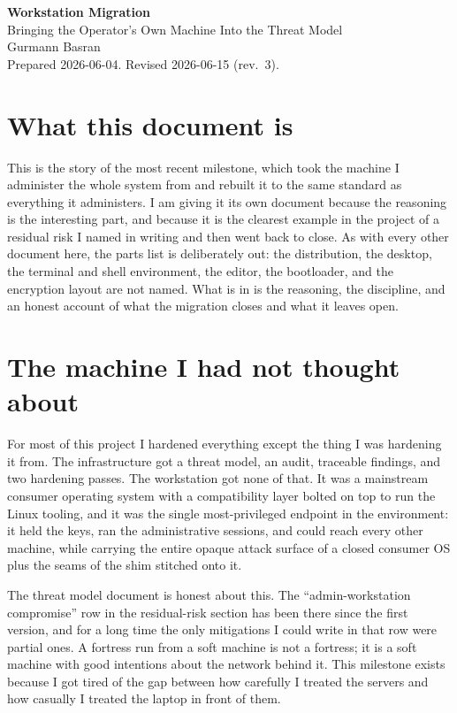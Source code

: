 \documentclass[12pt]{article}
\begin{document}
\begin{center}
{\LARGE\textbf{Workstation Migration}}\\[4pt]
{\large Bringing the Operator's Own Machine Into the Threat Model}\\[6pt]
Gurmann Basran\\
\small Prepared 2026-06-04. Revised 2026-06-15 (rev.\ 3).
\end{center}

\section{What this document is}

This is the story of the most recent milestone, which took the machine I administer the whole system from and rebuilt it to the same standard as everything it administers. I am giving it its own document because the reasoning is the interesting part, and because it is the clearest example in the project of a residual risk I named in writing and then went back to close. As with every other document here, the parts list is deliberately out: the distribution, the desktop, the terminal and shell environment, the editor, the bootloader, and the encryption layout are not named. What is in is the reasoning, the discipline, and an honest account of what the migration closes and what it leaves open.

\section{The machine I had not thought about}

For most of this project I hardened everything except the thing I was hardening it from. The infrastructure got a threat model, an audit, traceable findings, and two hardening passes. The workstation got none of that. It was a mainstream consumer operating system with a compatibility layer bolted on top to run the Linux tooling, and it was the single most-privileged endpoint in the environment: it held the keys, ran the administrative sessions, and could reach every other machine, while carrying the entire opaque attack surface of a closed consumer OS plus the seams of the shim stitched onto it.

The threat model document is honest about this. The ``admin-workstation compromise'' row in the residual-risk section has been there since the first version, and for a long time the only mitigations I could write in that row were partial ones. A fortress run from a soft machine is not a fortress; it is a soft machine with good intentions about the network behind it. This milestone exists because I got tired of the gap between how carefully I treated the servers and how casually I treated the laptop in front of them.
\end{document}
